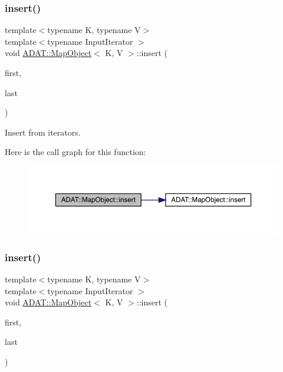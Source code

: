 \subsubsection{\texorpdfstring{insert()}{insert()}\hspace{0.1cm}{\footnotesize\ttfamily [5/9]}}
{\footnotesize\ttfamily template$<$typename K, typename V$>$ \\
template$<$typename Input\+Iterator $>$ \\
void \mbox{\hyperlink{classADAT_1_1MapObject}{A\+D\+A\+T\+::\+Map\+Object}}$<$ K, V $>$\+::insert (\begin{DoxyParamCaption}\item[{Input\+Iterator}]{first,  }\item[{Input\+Iterator}]{last }\end{DoxyParamCaption})\hspace{0.3cm}{\ttfamily [inline]}}



Insert from iterators. 

Here is the call graph for this function\+:
\nopagebreak
\begin{figure}[H]
\begin{center}
\leavevmode
\includegraphics[width=350pt]{da/d29/classADAT_1_1MapObject_a151aa826b6db5cd124ed13f4a293da2b_cgraph}
\end{center}
\end{figure}
\mbox{\label{classADAT_1_1MapObject_a151aa826b6db5cd124ed13f4a293da2b}} 
\subsubsection{\texorpdfstring{insert()}{insert()}\hspace{0.1cm}{\footnotesize\ttfamily [6/9]}}
{\footnotesize\ttfamily template$<$typename K, typename V$>$ \\
template$<$typename Input\+Iterator $>$ \\
void \mbox{\hyperlink{classADAT_1_1MapObject}{A\+D\+A\+T\+::\+Map\+Object}}$<$ K, V $>$\+::insert (\begin{DoxyParamCaption}\item[{Input\+Iterator}]{first,  }\item[{Input\+Iterator}]{last }\end{DoxyParamCaption})\hspace{0.3cm}{\ttfamily [inline]}}



